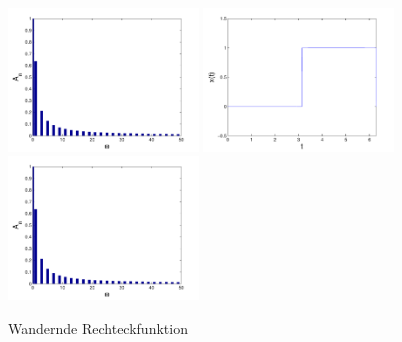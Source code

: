 \begin{figure}
\includegraphics[width=0.45\textwidth]{kugel/kSpektrum/Rechteck3_2.pdf}
\includegraphics[width=0.45\textwidth]{kugel/kSpektrum/Rechteck4_1.pdf}
\includegraphics[width=0.45\textwidth]{kugel/kSpektrum/Rechteck4_2.pdf}
\caption{Wandernde Rechteckfunktion
\label{skript:Spektrum1}}
\end{figure}
